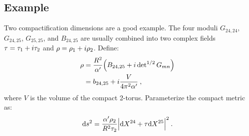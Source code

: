 \subsection*{Example}
Two compactification dimensions are a good example. The four moduli $G_{24,24}$, $G_{24,25}$, $G_{25,25}$, and $B_{24,25}$ are usually combined into two complex fields $\tau=\tau_{1}+i \tau_{2}$ and $\rho=\rho_{1}+i \rho_{2}$. 
Define:
\begin{align}
	\rho &= \frac{R^{2}}{\alpha^{\prime}}\Bigl(B_{24,25} + i \operatorname{det}^{1 / 2} G_{m n}\Bigr) \nonumber \\
	&= b_{24,25}+i \frac{V}{4 \pi^{2} \alpha^{\prime}} \:, \label{8.4.37}
\end{align}
where $V$ is the volume of the compact 2-torus. 
Parameterize the compact metric as:
\begin{equation}
	\mathrm{d} s^{2}=\frac{\alpha^{\prime} \rho_{2}}{R^{2} \tau_{2}}\Bigl|\mathrm{d} X^{24}+\tau \mathrm{d} X^{25}\Bigr|^{2} \:. \label{8.4.38}
\end{equation}
